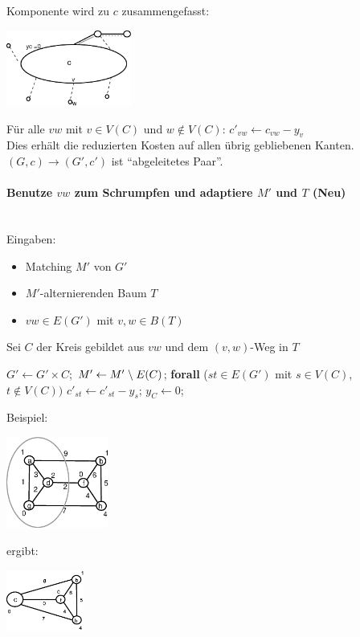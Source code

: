 Komponente wird zu $c$ zusammengefasst:

\includegraphics[height=2.5cm]{bilder/5-3SchrumpfAllg2}

Für alle $v w$ mit $v \in V(C)$ und $w \not \in V(C)$: $c'_{v w} 
\leftarrow c_{v w} -y_v$\\
Dies erhält die reduzierten Kosten auf allen übrig gebliebenen Kanten.
$(G,c) \rightarrow (G',c')$ ist "`abgeleitetes Paar"'.

\paragraph{Benutze $v w$ zum Schrumpfen und adaptiere $M'$ und $T$
(Neu)}\mbox{}\\
Eingaben:
\begin{itemize}
\item Matching $M'$ von $G'$
\item $M'$-alternierenden Baum $T$
\item $vw \in E(G')$ mit $v,w \in B(T)$
\end{itemize}
Sei $C$ der Kreis gebildet aus $v w$ und dem $(v,w)$-Weg in $T$

\begin{algorithmic}
\STATE $G' \leftarrow G' \times C$;
\STATE $M' \leftarrow M' \;\backslash\; E(C)$;
\STATE \textbf{forall} ($s t \in E(G')$ mit $s \in V(C)$, $t \not \in V(C))$
$c'_{s t} \leftarrow c'_{s t} - y_s$;
\STATE $y_C \leftarrow 0$;
\end{algorithmic}
Beispiel:

\includegraphics[height=3cm]{bilder/5-3vwSchrumpf}

ergibt:

\includegraphics[height=2cm]{bilder/5-3vwSchrumpf2}

